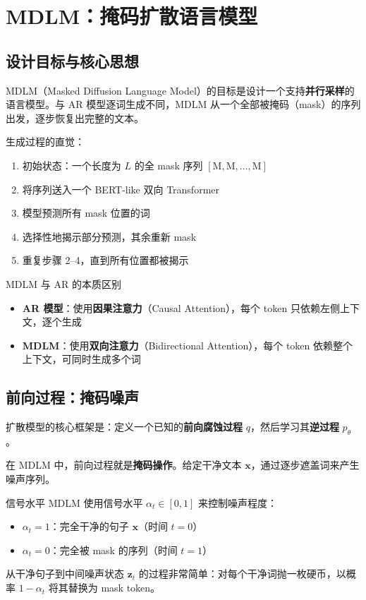 \section{MDLM：掩码扩散语言模型}

\subsection{设计目标与核心思想}

MDLM（Masked Diffusion Language Model）的目标是设计一个支持\textbf{并行采样}的语言模型。与 AR 模型逐词生成不同，MDLM 从一个全部被掩码（mask）的序列出发，逐步恢复出完整的文本。

生成过程的直觉：
\begin{enumerate}
    \item 初始状态：一个长度为 $L$ 的全 mask 序列 $[\text{M}, \text{M}, \ldots, \text{M}]$
    \item 将序列送入一个 BERT-like 双向 Transformer
    \item 模型预测所有 mask 位置的词
    \item 选择性地揭示部分预测，其余重新 mask
    \item 重复步骤 2--4，直到所有位置都被揭示
\end{enumerate}

\begin{importantbox}{MDLM 与 AR 的本质区别}
\begin{itemize}
    \item \textbf{AR 模型}：使用\textbf{因果注意力}（Causal Attention），每个 token 只依赖左侧上下文，逐个生成
    \item \textbf{MDLM}：使用\textbf{双向注意力}（Bidirectional Attention），每个 token 依赖整个上下文，可同时生成多个词
\end{itemize}
\end{importantbox}

\subsection{前向过程：掩码噪声}

扩散模型的核心框架是：定义一个已知的\textbf{前向腐蚀过程} $q$，然后学习其\textbf{逆过程} $p_\theta$。

在 MDLM 中，前向过程就是\textbf{掩码操作}。给定干净文本 $\mathbf{x}$，通过逐步遮盖词来产生噪声序列。

\begin{importantbox}{信号水平}
MDLM 使用信号水平 $\alpha_t \in [0, 1]$ 来控制噪声程度：
\begin{itemize}
    \item $\alpha_t = 1$：完全干净的句子 $\mathbf{x}$（时间 $t = 0$）
    \item $\alpha_t = 0$：完全被 mask 的序列（时间 $t = 1$）
\end{itemize}
从干净句子到中间噪声状态 $\mathbf{z}_t$ 的过程非常简单：对每个干净词抛一枚硬币，以概率 $1 - \alpha_t$ 将其替换为 mask token。
\end{importantbox}


